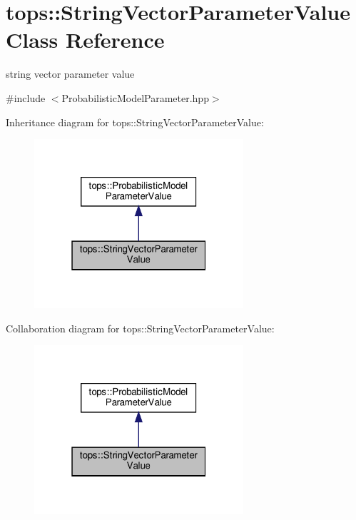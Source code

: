 \hypertarget{classtops_1_1StringVectorParameterValue}{}\section{tops\+:\+:String\+Vector\+Parameter\+Value Class Reference}
\label{classtops_1_1StringVectorParameterValue}


string vector parameter value  




{\ttfamily \#include $<$Probabilistic\+Model\+Parameter.\+hpp$>$}



Inheritance diagram for tops\+:\+:String\+Vector\+Parameter\+Value\+:
\nopagebreak
\begin{figure}[H]
\begin{center}
\leavevmode
\includegraphics[width=220pt]{classtops_1_1StringVectorParameterValue__inherit__graph}
\end{center}
\end{figure}


Collaboration diagram for tops\+:\+:String\+Vector\+Parameter\+Value\+:
\nopagebreak
\begin{figure}[H]
\begin{center}
\leavevmode
\includegraphics[width=220pt]{classtops_1_1StringVectorParameterValue__coll__graph}
\end{center}
\end{figure}
